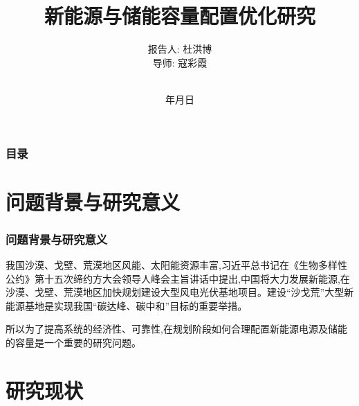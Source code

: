 \documentclass{beamer}
\renewcommand{\today}{\number\year 年\number\month 月\number\day 日}
\begin{document}
\title[新能源与储能容量配置优化研究]%
{新能源与储能容量配置优化研究}


\author[杜洪博]%
{报告人: 杜洪博\\
导\quad 师: 寇彩霞\rule[0pt]{0pt}{20pt}\\}

\institute[BUPT]{\textcolor[rgb]{0.0,0.0,0.10}%
{\small\ttfamily 北京邮电大学\ 理学院\\[10pt]}}

\date{\today}

\begin{frame}[plain]
	\titlepage
\end{frame}

\begin{frame}
	\frametitle{目录}
	\tableofcontents[hideallsubsections] %
\end{frame}

\AtBeginSection[] %
{ \begin{frame}<beamer> %
		\tableofcontents[currentsection,hideallsubsections]%
	\end{frame}
}


\section{问题背景与研究意义}

\begin{frame}
	\frametitle{问题背景与研究意义} 
	\qquad 我国沙漠、戈壁、荒漠地区风能、太阳能资源丰富,习近平总书记在《生物多样性公约》第十五次缔约方大会领导人峰会主旨讲话中提出,中国将大力发展新能源,在沙漠、戈壁、荒漠地区加快规划建设大型风电光伏基地项目。建设“沙戈荒”大型新能源基地是实现我国“碳达峰、碳中和”目标的重要举措。
	
	\qquad 所以为了提高系统的经济性、可靠性,在规划阶段如何合理配置新能源电源及储能的容量是一个重要的研究问题。
	
\end{frame}

\section{研究现状}
\end{document}
